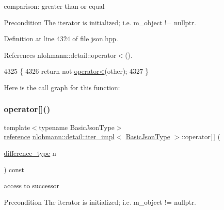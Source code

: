comparison\+: greater than or equal 

\begin{DoxyPrecond}{Precondition}
The iterator is initialized; i.\+e. {\ttfamily m\+\_\+object != nullptr}. 
\end{DoxyPrecond}


Definition at line 4324 of file json.\+hpp.



References nlohmann\+::detail\+::operator$<$().


\begin{DoxyCode}
4325     \{
4326         \textcolor{keywordflow}{return} not \hyperlink{classnlohmann_1_1detail_1_1iter__impl_a0d14cd76203e00bdcef6a64a5d055cc7}{operator<}(other);
4327     \}
\end{DoxyCode}
Here is the call graph for this function\+:
\mbox{\label{classnlohmann_1_1detail_1_1iter__impl_ac0b9276f1102ed4b9cd3f5f56287e3ce}} 
\subsubsection{\texorpdfstring{operator[]()}{operator[]()}}
{\footnotesize\ttfamily template$<$typename Basic\+Json\+Type$>$ \\
\hyperlink{classnlohmann_1_1detail_1_1iter__impl_a5be8001be099c6b82310f4d387b953ce}{reference} \hyperlink{classnlohmann_1_1detail_1_1iter__impl}{nlohmann\+::detail\+::iter\+\_\+impl}$<$ \hyperlink{classnlohmann_1_1detail_1_1iter__impl_abf18f18793f84b0222aebb5a2a87da7a}{Basic\+Json\+Type} $>$\+::operator\mbox{[}$\,$\mbox{]} (\begin{DoxyParamCaption}\item[{\hyperlink{classnlohmann_1_1detail_1_1iter__impl_a2f7ea9f7022850809c60fc3263775840}{difference\+\_\+type}}]{n }\end{DoxyParamCaption}) const\hspace{0.3cm}{\ttfamily [inline]}}



access to successor 

\begin{DoxyPrecond}{Precondition}
The iterator is initialized; i.\+e. {\ttfamily m\+\_\+object != nullptr}. 
\end{DoxyPrecond}


